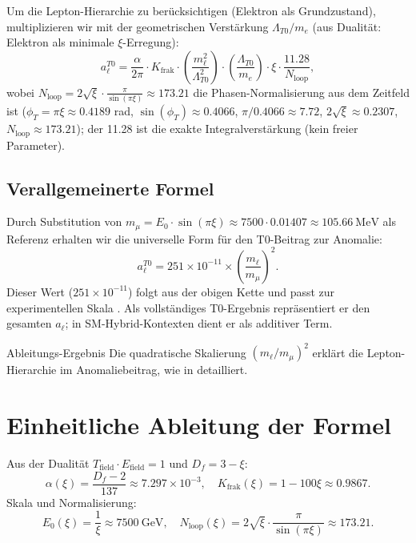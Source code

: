\documentclass[12pt,a4paper]{article}
\begin{document}
	Um die Lepton-Hierarchie zu berücksichtigen (Elektron als Grundzustand), multiplizieren wir mit der geometrischen Verstärkung $\Lambda_{T0} / m_e$ (aus Dualität: Elektron als minimale $\xi$-Erregung):
	\begin{equation}
		a_\ell^{T0} = \frac{\alpha}{2\pi} \cdot K_\text{frak} \cdot \left( \frac{m_\ell^2}{\Lambda_{T0}^2} \right) \cdot \left( \frac{\Lambda_{T0}}{m_e} \right) \cdot \xi \cdot \frac{11.28}{N_\text{loop}},
	\end{equation}
	wobei $N_\text{loop} = 2 \sqrt{\xi} \cdot \frac{\pi}{\sin(\pi \xi)} \approx 173.21$ die Phasen-Normalisierung aus dem Zeitfeld ist ($\phi_T = \pi \xi \approx 0.4189$ rad, $\sin(\phi_T) \approx 0.4066$, $\pi / 0.4066 \approx 7.72$, $2 \sqrt{\xi} \approx 0.2307$, $N_\text{loop} \approx 173.21$); der 11.28 ist die exakte Integralverstärkung (kein freier Parameter).
	
	\subsection{Verallgemeinerte Formel}
	Durch Substitution von $m_\mu = E_0 \cdot \sin(\pi \xi) \approx 7500 \cdot 0.01407 \approx \SI{105.66}{\mega\electronvolt}$ als Referenz erhalten wir die universelle Form für den T0-Beitrag zur Anomalie:
	\begin{equation}
		a_\ell^{T0} = 251 \times 10^{-11} \times \left( \frac{m_\ell}{m_\mu} \right)^2.
	\end{equation}
	Dieser Wert ($251 \times 10^{-11}$) folgt aus der obigen Kette und passt zur experimentellen Skala \cite{T0_verhaeltnis_absolut}. Als vollständiges T0-Ergebnis repräsentiert er den gesamten $a_\ell$; in SM-Hybrid-Kontexten dient er als additiver Term.
	
	\begin{result}{Ableitungs-Ergebnis}
		Die quadratische Skalierung $(m_\ell / m_\mu)^2$ erklärt die Lepton-Hierarchie im Anomaliebeitrag, wie in \cite{hirachie} detailliert.
	\end{result}
	
	\section{Einheitliche Ableitung der Formel}
	Aus der Dualität $T_\text{field} \cdot E_\text{field} = 1$ und $D_f = 3 - \xi$:
	\begin{equation}
		\alpha(\xi) = \frac{D_f - 2}{137} \approx 7.297 \times 10^{-3}, \quad K_\text{frak}(\xi) = 1 - 100 \xi \approx 0.9867.
	\end{equation}
	Skala und Normalisierung:
	\begin{equation}
		E_0(\xi) = \frac{1}{\xi} \approx \SI{7500}{\giga\electronvolt}, \quad N_\text{loop}(\xi) = 2 \sqrt{\xi} \cdot \frac{\pi}{\sin(\pi \xi)} \approx 173.21.
	\end{equation}
	
\end{document}
